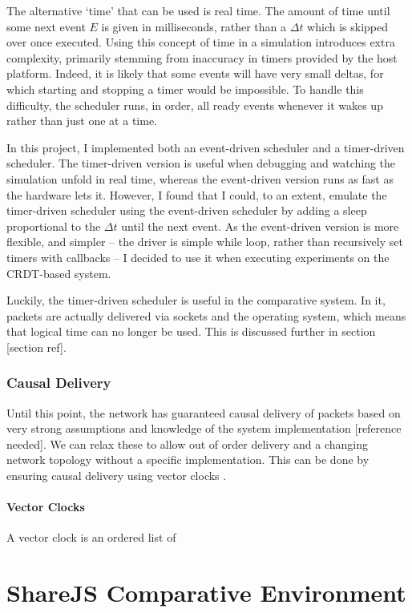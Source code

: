 \documentclass[12pt,a4paper,twoside,openright]{report}
\begin{document}
		The alternative `time' that can be used is real time. The amount of time until some next event $E$ is given in milliseconds, rather than a $\Delta t$ which is skipped over once executed. Using this concept of time in a simulation introduces extra complexity, primarily stemming from inaccuracy in timers provided by the host platform. Indeed, it is likely that some events will have very small deltas, for which starting and stopping a timer would be impossible. To handle this difficulty, the scheduler runs, in order, all ready events whenever it wakes up rather than just one at a time.
		
		In this project, I implemented both an event-driven scheduler and a timer-driven scheduler. The timer-driven version is useful when debugging and watching the simulation unfold in real time, whereas the event-driven version runs as fast as the hardware lets it. However, I found that I could, to an extent, emulate the timer-driven scheduler using the event-driven scheduler by adding a sleep proportional to the $\Delta t$ until the next event. As the event-driven version is more flexible, and simpler -- the driver is simple while loop, rather than recursively set timers with callbacks -- I decided to use it when executing experiments on the CRDT-based system.
		
		Luckily, the timer-driven scheduler is useful in the comparative system. In it, packets are actually delivered via sockets and the operating system, which means that logical time can no longer be used. This is discussed further in section [section ref].
		
		
		\subsubsection{Causal Delivery}
		Until this point, the network has guaranteed causal delivery of packets based on very strong assumptions and knowledge of the system implementation [reference needed]. We can relax these to allow out of order delivery and a changing network topology without a specific implementation. This can be done by ensuring causal delivery using vector clocks \cite[Lecture 4]{concdistsystems}.
		
		\paragraph{Vector Clocks}
		A vector clock is an ordered list of 
		
	
\section{ShareJS Comparative Environment}
\end{document}
